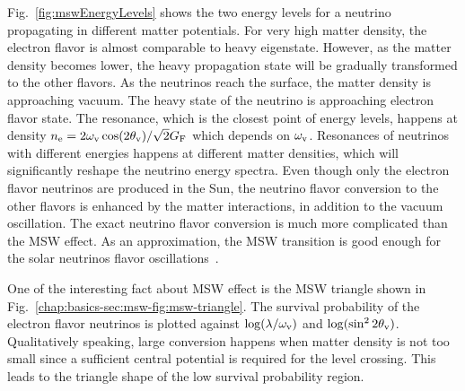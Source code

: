 Fig.~\ref{fig:mswEnergyLevels} shows the two energy levels for a neutrino propagating in different matter potentials. For very high matter density, the electron flavor is almost comparable to heavy eigenstate. However, as the matter density becomes lower, the heavy propagation state will be gradually transformed to the other flavors. As the neutrinos reach the surface, the matter density is approaching vacuum. The heavy state of the neutrino is approaching electron flavor state. The resonance, which is the closest point of energy levels, happens at density $n_{\mathrm e} = 2\omega_\mathrm v \cos(2\theta_\mathrm v)/\sqrt{2}G_{\mathrm F}$ which depends on $\omega_\mathrm v$. Resonances of neutrinos with different energies happens at different matter densities, which will significantly reshape the neutrino energy spectra. Even though only the electron flavor neutrinos are produced in the Sun, the neutrino flavor conversion to the other flavors is enhanced by the matter interactions, in addition to the vacuum oscillation. The exact neutrino flavor conversion is much more complicated than the MSW effect. As an approximation, the MSW transition is good enough for the solar neutrinos flavor oscillations~\cite{Lopes2013a}.

One of the interesting fact about MSW effect is the MSW triangle shown in Fig.~\ref{chap:basics-sec:msw-fig:msw-triangle}. The survival probability of the electron flavor neutrinos is plotted against $\log (\lambda/\omega_\mathrm v)$ and $\log (\sin^2 2\theta_\mathrm v)$. Qualitatively speaking, large conversion happens when matter density is not too small since a sufficient central potential is required for the level crossing. This leads to the triangle shape of the low survival probability region.

